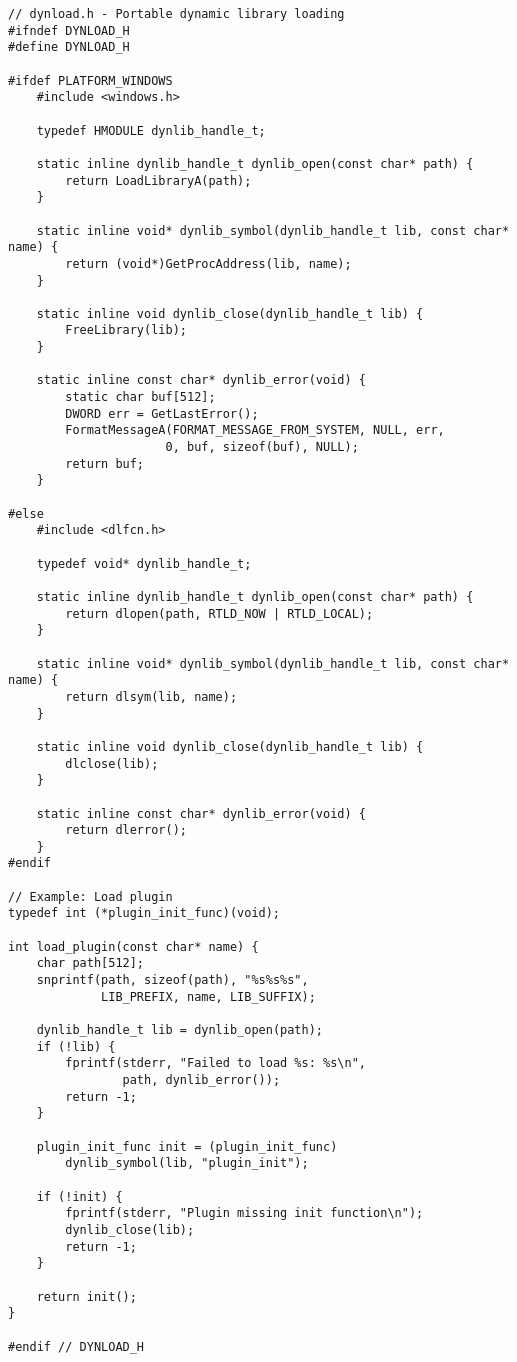 \begin{lstlisting}
// dynload.h - Portable dynamic library loading
#ifndef DYNLOAD_H
#define DYNLOAD_H

#ifdef PLATFORM_WINDOWS
    #include <windows.h>

    typedef HMODULE dynlib_handle_t;

    static inline dynlib_handle_t dynlib_open(const char* path) {
        return LoadLibraryA(path);
    }

    static inline void* dynlib_symbol(dynlib_handle_t lib, const char* name) {
        return (void*)GetProcAddress(lib, name);
    }

    static inline void dynlib_close(dynlib_handle_t lib) {
        FreeLibrary(lib);
    }

    static inline const char* dynlib_error(void) {
        static char buf[512];
        DWORD err = GetLastError();
        FormatMessageA(FORMAT_MESSAGE_FROM_SYSTEM, NULL, err,
                      0, buf, sizeof(buf), NULL);
        return buf;
    }

#else
    #include <dlfcn.h>

    typedef void* dynlib_handle_t;

    static inline dynlib_handle_t dynlib_open(const char* path) {
        return dlopen(path, RTLD_NOW | RTLD_LOCAL);
    }

    static inline void* dynlib_symbol(dynlib_handle_t lib, const char* name) {
        return dlsym(lib, name);
    }

    static inline void dynlib_close(dynlib_handle_t lib) {
        dlclose(lib);
    }

    static inline const char* dynlib_error(void) {
        return dlerror();
    }
#endif

// Example: Load plugin
typedef int (*plugin_init_func)(void);

int load_plugin(const char* name) {
    char path[512];
    snprintf(path, sizeof(path), "%s%s%s",
             LIB_PREFIX, name, LIB_SUFFIX);

    dynlib_handle_t lib = dynlib_open(path);
    if (!lib) {
        fprintf(stderr, "Failed to load %s: %s\n",
                path, dynlib_error());
        return -1;
    }

    plugin_init_func init = (plugin_init_func)
        dynlib_symbol(lib, "plugin_init");

    if (!init) {
        fprintf(stderr, "Plugin missing init function\n");
        dynlib_close(lib);
        return -1;
    }

    return init();
}

#endif // DYNLOAD_H
\end{lstlisting}

